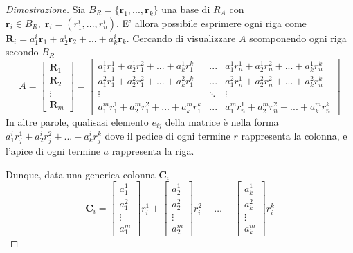 \documentclass{article}
\begin{document}
    \begin{proof}[Dimostrazione]
        Sia $B_R = \{\mathbf{r}_{1}, ..., \mathbf{r}_{k}\}$ una base di $R_A$ con $\mathbf{r}_{i} \in B_R, \; \mathbf{r}_{i} = (r_{1}^{i}, ..., r_{n}^{i})$. E' allora possibile esprimere ogni riga come $\mathbf{R}_{i} = a_{1}^{i} \mathbf{r}_{1} + a_{2}^{i} \mathbf{r}_{2} + ... + a_{k}^{i} \mathbf{r}_{k}$. 
        Cercando di visualizzare $A$ scomponendo ogni riga secondo $B_R$
        \[
            A = 
            \begin{bmatrix}
                \mathbf{R}_{1} \\
                \mathbf{R}_{2} \\
                \vdots \\
                \mathbf{R}_{m}
            \end{bmatrix}
            =
            \begin{bmatrix}
                a_{1}^{1} r_{1}^{1} + a_{2}^{1} r_{1}^{2} + ... + a_{k}^{1} r_{1}^{k} & ... & a_{1}^{1} r_{n}^{1} + a_{2}^{1} r_{n}^{2} + ... + a_{k}^{1} r_{n}^{k} \\
                a_{1}^{2} r_{1}^{1} + a_{2}^{2} r_{1}^{2} + ... + a_{k}^{2} r_{1}^{k} & ... & a_{1}^{2} r_{n}^{1} + a_{2}^{2} r_{n}^{2} + ... + a_{k}^{2} r_{n}^{k} \\
                \vdots & \ddots & \vdots \\
                a_{1}^{m} r_{1}^{1} + a_{2}^{m} r_{1}^{2} + ... + a_{k}^{m} r_{1}^{k} & ... & a_{1}^{m} r_{n}^{1} + a_{2}^{m} r_{n}^{2} + ... + a_{k}^{m} r_{n}^{k} 
            \end{bmatrix}
        \]
        In altre parole, qualisasi elemento $e_{ij}$ della matrice è nella forma $a_{1}^{i} r_{j}^{1} + a_{2}^{i} r_{j}^{2} + ... + a_{k}^{i} r_{j}^{k}$ dove il pedice di ogni termine $r$ rappresenta la colonna, e l'apice di ogni termine $a$ rappresenta la riga.
        
        Dunque, data una generica colonna $\mathbf{C}_{i}$ 
        \[
            \mathbf{C}_{i} = 
            \begin{bmatrix}
                a_{1}^{1} \\
                a_{1}^{2} \\
                \vdots \\
                a_{1}^{m}
            \end{bmatrix}
            r_{i}^{1}
            + 
            \begin{bmatrix}
                a_{2}^{1} \\
                a_{2}^{2} \\
                \vdots \\
                a_{2}^{m}
            \end{bmatrix}
            r_{i}^{2}
            +
            \dots
            +
            \begin{bmatrix}
                a_{k}^{1} \\
                a_{k}^{2} \\
                \vdots \\
                a_{k}^{m}
            \end{bmatrix}
            r_{i}^{k}
        \]
        

\end{proof}
\end{document}
